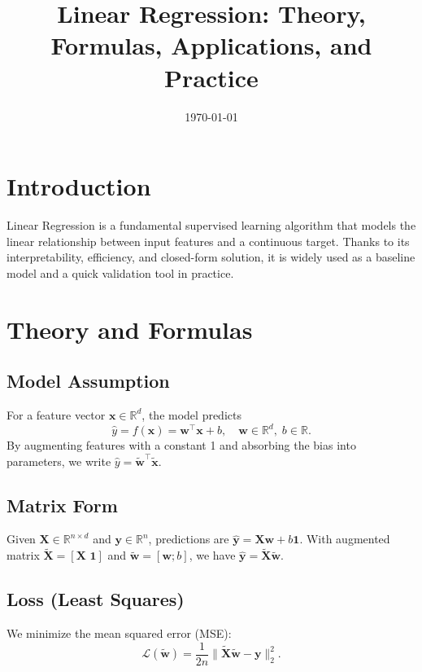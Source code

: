 \documentclass{article}
\title{Linear Regression: Theory, Formulas, Applications, and Practice}
\author{}
\date{\today}
\begin{document}
\maketitle
\tableofcontents

\section{Introduction}
Linear Regression is a fundamental supervised learning algorithm that models the linear relationship between input features and a continuous target. Thanks to its interpretability, efficiency, and closed-form solution, it is widely used as a baseline model and a quick validation tool in practice.

\section{Theory and Formulas}
\subsection{Model Assumption}
For a feature vector \(\mathbf{x} \in \mathbb{R}^d\), the model predicts
\begin{equation}
    \hat{y} = f(\mathbf{x}) = \mathbf{w}^\top \mathbf{x} + b,\quad \mathbf{w} \in \mathbb{R}^d,\; b \in \mathbb{R}.
\end{equation}
By augmenting features with a constant 1 and absorbing the bias into parameters, we write \(\hat{y} = \tilde{\mathbf{w}}^\top \tilde{\mathbf{x}}\).

\subsection{Matrix Form}
Given \(\mathbf{X}\in\mathbb{R}^{n\times d}\) and \(\mathbf{y}\in\mathbb{R}^{n}\), predictions are \(\hat{\mathbf{y}}=\mathbf{X}\mathbf{w}+b\mathbf{1}\). With augmented matrix \(\tilde{\mathbf{X}}=[\mathbf{X}\,\,\mathbf{1}]\) and \(\tilde{\mathbf{w}}=[\mathbf{w};b]\), we have \(\hat{\mathbf{y}}=\tilde{\mathbf{X}}\tilde{\mathbf{w}}\).

\subsection{Loss (Least Squares)}
We minimize the mean squared error (MSE):
\begin{equation}
    \mathcal{L}(\tilde{\mathbf{w}}) = \frac{1}{2n} \lVert \tilde{\mathbf{X}}\tilde{\mathbf{w}} - \mathbf{y} \rVert_2^2.
\end{equation}
\end{document}
